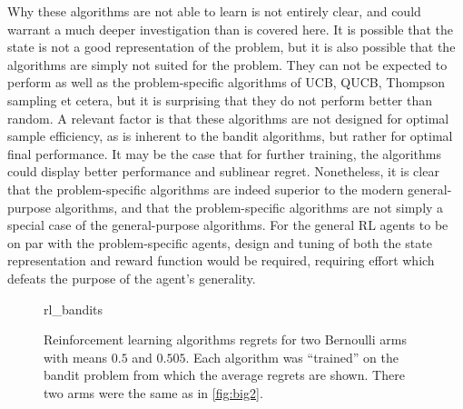 Why these algorithms are not able to learn is not entirely clear, and could warrant a much deeper investigation than is covered here.
It is possible that the state is not a good representation of the problem, but it is also possible that the algorithms are simply not suited for the problem.
They can not be expected to perform as well as the problem-specific algorithms of UCB, QUCB, Thompson sampling et cetera, but it is surprising that they do not perform better than random.
A relevant factor is that these algorithms are not designed for optimal sample efficiency, as is inherent to the bandit algorithms, but rather for optimal final performance.
It may be the case that for further training, the algorithms could display better performance and sublinear regret.
Nonetheless, it is clear that the problem-specific algorithms are indeed superior to the modern general-purpose algorithms, and that the problem-specific algorithms are not simply a special case of the general-purpose algorithms.
For the general RL agents to be on par with the problem-specific agents, design and tuning of both the state representation and reward function would be required, requiring effort which defeats the purpose of the agent's generality.

\begin{figure}
    \centering
    \newcommand{\myoptions}{
        width=10cm,
        height=8cm,
        xlabel={Kiloturn},
        ylabel={Regret},
        legend entries={Baseline, A2C, DQN, PPO, QNN},
        legend pos=north west,
        legend cell align=left,
        mystyle,
    }
    {rl_bandits}
    \caption[
        Reinforcement learning algorithms regrets.
    ]
    {
        Reinforcement learning algorithms regrets for two Bernoulli arms with means $0.5$ and $0.505$.
        Each algorithm was \enquote{trained} on the bandit problem from which the average regrets are shown.
        There two arms were the same as in \cref{fig:big2}.
    }
    \label{fig:rl_bandits}
\end{figure}